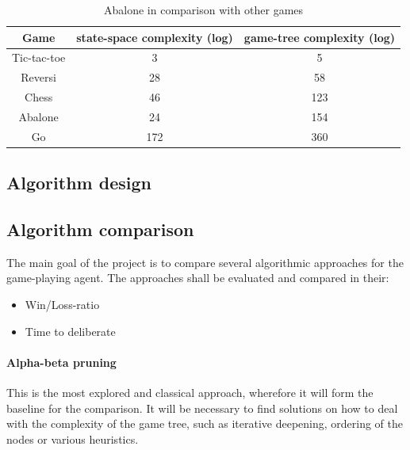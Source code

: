 \documentclass{llncs}
\begin{document}
\begin{table}
  \begin{center}
    \begin{tabular}{ | c | c | c | }
      \hline
      Game        & state-space complexity (log) & game-tree complexity (log) \\
      \hline
      Tic-tac-toe & 3                            & 5                          \\
      \hline
      Reversi     & 28                           & 58                         \\
      \hline
      Chess       & 46                           & 123                        \\
      \hline
      Abalone     & 24                           & 154                        \\
      \hline
      Go          & 172                          & 360                        \\
      \hline
    \end{tabular}
  \end{center}
  \caption{Abalone in comparison with other games \cite{chorus_implementing_2009}}
  \label{complexity_table}
\end{table}


\subsection{Algorithm design}


\subsection{Algorithm comparison}
The main goal of the project is to compare several algorithmic approaches for the game-playing agent. The approaches shall be evaluated and compared in their:

\begin{itemize}
  \item Win/Loss-ratio
  \item Time to deliberate
\end{itemize}


\paragraph{Alpha-beta pruning}
This is the most explored and classical approach, wherefore it will form the baseline for the comparison. It will be necessary to find solutions on how to deal with the complexity of the game tree, such as iterative deepening, ordering of the nodes or various heuristics.
\end{document}
